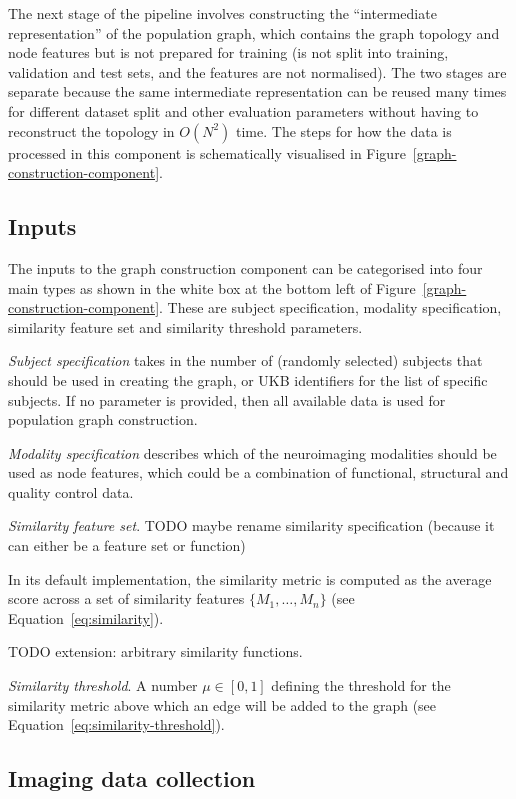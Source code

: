 The next stage of the pipeline involves constructing the ``intermediate representation'' of the population graph, which contains the graph topology and node features but is not prepared for training (is not split into training, validation and test sets, and the features are not normalised). The two stages are separate because the same intermediate representation can be reused many times for different dataset split and other evaluation parameters without having to reconstruct the topology in $O(N^2)$ time. The steps for how the data is processed in this component is schematically visualised in Figure~\ref{graph-construction-component}.

\subsection{Inputs}
The inputs to the graph construction component can be categorised into four main types as shown in the white box at the bottom left of Figure~\ref{graph-construction-component}. These are subject specification, modality specification, similarity feature set and similarity threshold parameters.

\textit{Subject specification} takes in the number of (randomly selected) subjects that should be used in creating the graph, or UKB identifiers for the list of specific subjects. If no parameter is provided, then all available data is used for population graph construction.

\textit{Modality specification} describes which of the neuroimaging modalities should be used as node features, which could be a combination of functional, structural and quality control data.

\textit{Similarity feature set}. 
TODO maybe rename similarity specification (because it can either be a feature set or function)

In its default implementation, the similarity metric is computed as the average score across a set of similarity features $\{M_1, \dots, M_n\}$ (see Equation~\eqref{eq:similarity}). 

TODO extension: arbitrary similarity functions.

\textit{Similarity threshold}. A number $\mu \in [0,1]$ defining the threshold for the similarity metric above which an edge will be added to the graph (see Equation~\eqref{eq:similarity-threshold}).

\subsection{Imaging data collection}

